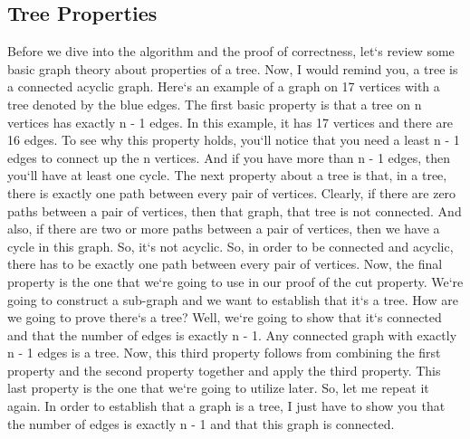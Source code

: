 \subsection{Tree Properties}
Before we dive into the algorithm and the proof of correctness, let`s review some basic graph theory about properties of a tree.
Now, I would remind you, a tree is a connected acyclic graph.
Here`s an example of a graph on 17 vertices with a tree denoted by the blue edges.
The first basic property is that a tree on n vertices has exactly n - 1 edges.
In this example, it has 17 vertices and there are 16 edges.
To see why this property holds, you`ll notice that you need a least n - 1 edges to connect up the n vertices.
And if you have more than n - 1 edges, then you`ll have at least one cycle.
The next property about a tree is that, in a tree, there is exactly one path between every pair of vertices.
Clearly, if there are zero paths between a pair of vertices, then that graph, that tree is not connected.
And also, if there are two or more paths between a pair of vertices, then we have a cycle in this graph.
So, it`s not acyclic.
So, in order to be connected and acyclic, there has to be exactly one path between every pair of vertices.
Now, the final property is the one that we`re going to use in our proof of the cut property.
We`re going to construct a sub-graph and we want to establish that it`s a tree.
How are we going to prove there`s a tree? Well, we`re going to show that it`s connected and that the number of edges is exactly n - 1.
Any connected graph with exactly n - 1 edges is a tree.
Now, this third property follows from combining the first property and the second property together and apply the third property.
This last property is the one that we`re going to utilize later.
So, let me repeat it again.
In order to establish that a graph is a tree, I just have to show you that the number of edges is exactly n - 1 and that this graph is connected.

